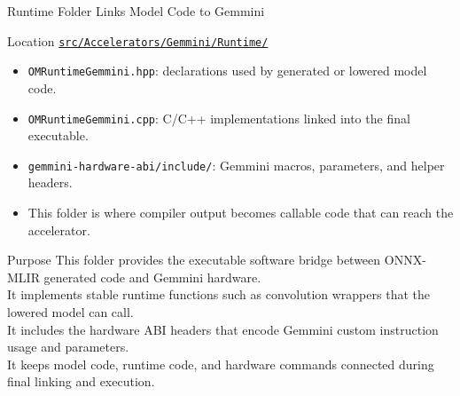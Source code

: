 \documentclass[aspectratio=169,10pt]{beamer}
\newcommand{\code}[1]{\texttt{\footnotesize #1}}
\newcommand{\repoRoot}{/home/lahcen/toolchains/onnx-mlir-xcompile/onnx-mlir}
\newcommand{\pathcode}[1]{\href{run:\repoRoot/#1}{\texttt{\scriptsize #1}}}
\begin{document}
\begin{frame}{Runtime Folder Links Model Code to Gemmini}
  \begin{block}{Location}
    \pathcode{src/Accelerators/Gemmini/Runtime/}
  \end{block}
  \begin{itemize}
    \item \code{OMRuntimeGemmini.hpp}: declarations used by generated or lowered model code.
    \item \code{OMRuntimeGemmini.cpp}: C/C++ implementations linked into the final executable.
    \item \code{gemmini-hardware-abi/include/}: Gemmini macros, parameters, and helper headers.
    \item This folder is where compiler output becomes callable code that can reach the accelerator.
  \end{itemize}
  \begin{block}{Purpose}
    This folder provides the executable software bridge between ONNX-MLIR generated code and Gemmini hardware.\\
    It implements stable runtime functions such as convolution wrappers that the lowered model can call.\\
    It includes the hardware ABI headers that encode Gemmini custom instruction usage and parameters.\\
    It keeps model code, runtime code, and hardware commands connected during final linking and execution.
  \end{block}
\end{frame}
\end{document}
